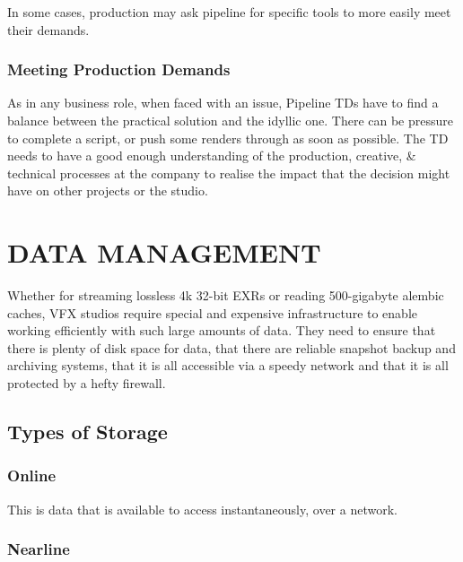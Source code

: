 In some cases, production may ask pipeline for specific tools to more easily meet their demands.

\hypertarget{meeting-production-demands}{%
\subsubsection{Meeting Production Demands}\label{meeting-production-demands}}

As in any business role, when faced with an issue, Pipeline TDs have to find a balance between the practical solution and the idyllic one. There can be pressure to complete a script, or push some renders through as soon as possible. The TD needs to have a good enough understanding of the production, creative, \& technical processes at the company to realise the impact that the decision might have on other projects or the studio.

\pagebreak\hypertarget{data-management}{%
\section{DATA MANAGEMENT}\label{data-management}}

Whether for streaming lossless 4k 32-bit EXRs or reading 500-gigabyte alembic caches, VFX studios require special and expensive infrastructure to enable working efficiently with such large amounts of data. They need to ensure that there is plenty of disk space for data, that there are reliable snapshot backup and archiving systems, that it is all accessible via a speedy network and that it is all protected by a hefty firewall.

\hypertarget{types-of-storage}{%
\subsection{Types of Storage}\label{types-of-storage}}

\hypertarget{online}{%
\subsubsection{Online}\label{online}}

This is data that is available to access instantaneously, over a network.

\hypertarget{nearline}{%
\subsubsection{Nearline}\label{nearline}}

